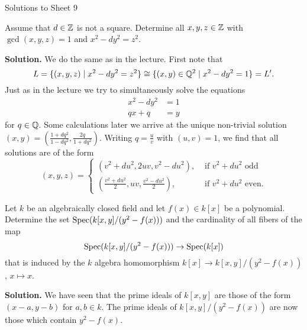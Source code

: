 \documentclass[a4paper,11pt]{article}
\begin{document}
\begin{center}
    \huge{Solutions to Sheet 9}
\end{center}

Assume that $d \in \mathbb{Z}$ is not a square. Determine all $x,y,z \in \mathbb{Z}$ with
$\gcd(x,y,z) = 1$ and $x^2 - dy^2 = z^2$. 

\textbf{Solution.} 
We do the same as in the lecture. First note that
\begin{equation*}
    L = \{(x,y,z) \mid x^2 - dy^2 = z^2\} \cong \{(x,y) \in \mathbb{Q}^2 \mid
    x^2 - dy^2 = 1\} = L'.
\end{equation*}
Just as in the lecture we try to simultaneously solve the equations
\begin{equation*}
\begin{aligned}
    x^2 - dy^2 &= 1 \\
    qx + q &= y
\end{aligned}
\end{equation*}
for $q \in \mathbb{Q}$.
Some calculations later we arrive at the unique non-trivial solution $(x,y) =
(\frac{1+dq^2}{1-dq^2}, \frac{2q}{1+dq^2}).$ Writing $q = \frac uv$ with
$(u,v) = 1$, we find that all solutions are of the form
\begin{equation*}
    (x,y,z) = \begin{cases}
        (v^2 + du^2, 2uv, v^2 - du^2), &\text{ if }v^2+ du^2 \text{ odd}\\
        (\frac{v^2 + du^2}2, uv, \frac{v^2 - du^2}2), &\text{ if }v^2+ du^2
        \text{ even.}
    \end{cases}
\end{equation*}

Let $k$ be an algebraically closed field and let $f(x) \in k[x]$ be a polynomial.
Determine the set $\operatorname{Spec}(k[x,y]/(y^2 - f(x)))$ and the cardinality of all fibers
of the map
\begin{equation*}
    \operatorname{Spec}(k[x,y]/(y^2 - f(x))) \to \operatorname{Spec}(k[x])
\end{equation*}
that is induced by the $k$ algebra homomorphism $k[x] \to k[x,y]/(y^2-f(x))$, 
$x \mapsto x$. 

\textbf{Solution.}
We have seen that the prime ideals of $k[x,y]$ are those of the form 
$(x-a, y-b)$ for $a, b \in k$. The prime ideals of $k[x,y]/(y^2-f(x))$ are now 
those which contain $y^2 - f(x)$. 
\end{document}
